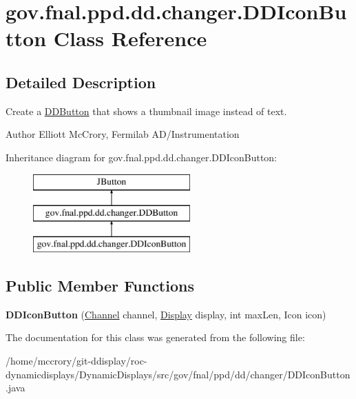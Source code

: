 \hypertarget{classgov_1_1fnal_1_1ppd_1_1dd_1_1changer_1_1DDIconButton}{\section{gov.\-fnal.\-ppd.\-dd.\-changer.\-D\-D\-Icon\-Button Class Reference}
\label{classgov_1_1fnal_1_1ppd_1_1dd_1_1changer_1_1DDIconButton}
}


\subsection{Detailed Description}
Create a \hyperlink{classgov_1_1fnal_1_1ppd_1_1dd_1_1changer_1_1DDButton}{D\-D\-Button} that shows a thumbnail image instead of text.

\begin{DoxyAuthor}{Author}
Elliott Mc\-Crory, Fermilab A\-D/\-Instrumentation 
\end{DoxyAuthor}
Inheritance diagram for gov.\-fnal.\-ppd.\-dd.\-changer.\-D\-D\-Icon\-Button\-:\begin{figure}[H]
\begin{center}
\leavevmode
\includegraphics[height=3.000000cm]{classgov_1_1fnal_1_1ppd_1_1dd_1_1changer_1_1DDIconButton}
\end{center}
\end{figure}
\subsection*{Public Member Functions}
\begin{DoxyCompactItemize}
\item 
\hypertarget{classgov_1_1fnal_1_1ppd_1_1dd_1_1changer_1_1DDIconButton_a3ce3ff53b260e4cbbc984438c6b6d76a}{{\bfseries D\-D\-Icon\-Button} (\hyperlink{interfacegov_1_1fnal_1_1ppd_1_1dd_1_1signage_1_1Channel}{Channel} channel, \hyperlink{interfacegov_1_1fnal_1_1ppd_1_1dd_1_1signage_1_1Display}{Display} display, int max\-Len, Icon icon)}\label{classgov_1_1fnal_1_1ppd_1_1dd_1_1changer_1_1DDIconButton_a3ce3ff53b260e4cbbc984438c6b6d76a}

\end{DoxyCompactItemize}


The documentation for this class was generated from the following file\-:\begin{DoxyCompactItemize}
\item 
/home/mccrory/git-\/ddisplay/roc-\/dynamicdisplays/\-Dynamic\-Displays/src/gov/fnal/ppd/dd/changer/D\-D\-Icon\-Button.\-java\end{DoxyCompactItemize}
